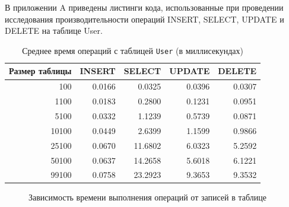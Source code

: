 В приложении A приведены листинги кода, использованные при проведении исследования производительности операций INSERT, SELECT, UPDATE и DELETE на таблице User.

\newpage
\begin{table}[ht]
	\centering
	\caption{Среднее время операций с таблицей \texttt{User} (в миллисекундах)}
	\begin{tabular}{|r|r|r|r|r|}
		\hline
		Размер таблицы & INSERT & SELECT & UPDATE & DELETE \\
		\hline
		100   & 0.0166 & 0.0325  & 0.0396  & 0.0307  \\
		1100   & 0.0183  & 0.2800 & 0.1231  & 0.0951  \\
		5100   & 0.0332 & 1.1239  & 0.5739  & 0.0871  \\
		10100   & 0.0449  & 2.6399  & 1.1599  & 0.9866  \\
		25100  &0.0670  & 11.6802 & 6.0323  & 5.2592  \\
		50100  & 0.0637  & 14.2658  & 5.6018  & 6.1221 \\
		99100 & 0.0758  & 23.2923  &9.3653  & 9.3532 \\
		\hline
	\end{tabular}
	\label{tab:user_performance}
\end{table}

\begin{figure}[ht!]
	\begin{center}
	\end{center}
	\caption{Зависимость времени выполнения операций от записей в таблице}
	\label{grp:dr}
\end{figure}

